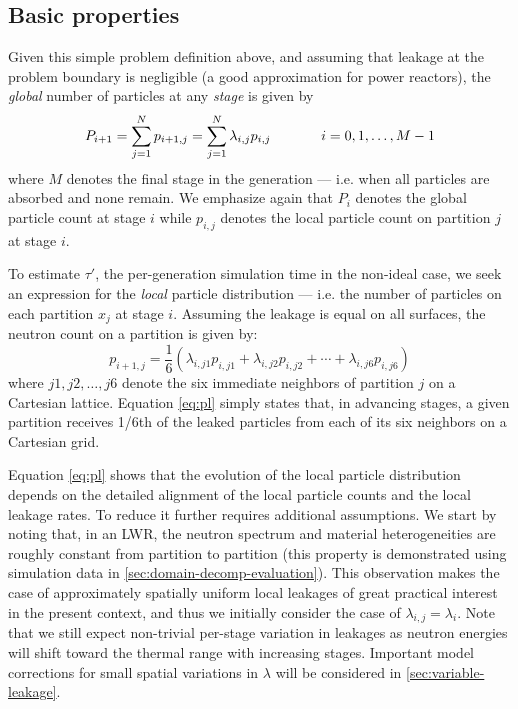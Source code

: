 \subsection{Basic properties}

Given this simple problem definition above, and assuming that leakage at the
problem boundary is negligible (a good approximation for power reactors), the
\emph{global} number of particles at any \emph{stage} is given by
\begin{equation}
  \label{eq:pg}
  P_{i+1} = \sum_{j=1}^N p_{i+1,j} = \sum_{j=1}^N \lambda_{i,j}
  p_{i,j} \hspace{.5in} i=0,1,\dotsc,M-1
\end{equation}
where $M$ denotes the final stage in the generation --- i.e. when all particles
are absorbed and none remain. We emphasize again that $P_i$ denotes the global
particle count at stage $i$ while $p_{i,j}$ denotes the local particle count on
partition $j$ at stage $i$.

To estimate $\tau'$, the per-generation simulation time in the non-ideal case,
we seek an expression for the \emph{local} particle distribution --- i.e. the
number of particles on each partition $x_j$ at stage $i$. Assuming the leakage
is equal on all surfaces, the neutron count on a partition is given by:
\begin{equation}
  \label{eq:pl}
  p_{i+1,j} = \frac{1}{6} \left( \lambda_{i,j1}p_{i,j1} + \lambda_{i,j2}p_{i,j2}
  + \dotsb + \lambda_{i,j6}p_{i,j6} \right)
\end{equation}
where $j1,j2,\dotsc,j6$ denote the six immediate neighbors of partition $j$ on a
Cartesian lattice. Equation \eqref{eq:pl} simply states that, in advancing
stages, a given partition receives 1/6th of the leaked particles from each of
its six neighbors on a Cartesian grid.

Equation \eqref{eq:pl} shows that the evolution of the local particle
distribution depends on the detailed alignment of the local particle counts and
the local leakage rates. To reduce it further requires additional
assumptions. We start by noting that, in an LWR, the neutron spectrum and
material heterogeneities are roughly constant from partition to partition (this
property is demonstrated using simulation data in
\autoref{sec:domain-decomp-evaluation}). This observation makes the case of
approximately spatially uniform local leakages of great practical interest in
the present context, and thus we initially consider the case of $\lambda_{i,j} =
\lambda_i$. Note that we still expect non-trivial per-stage variation in
leakages as neutron energies will shift toward the thermal range with increasing
stages. Important model corrections for small spatial variations in $\lambda$
will be considered in \autoref{sec:variable-leakage}.

